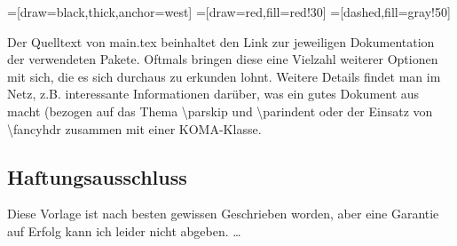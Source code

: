 =[draw=black,thick,anchor=west]
=[draw=red,fill=red!30]
=[dashed,fill=gray!50]

Der Quelltext von main.tex beinhaltet den Link zur jeweiligen Dokumentation der verwendeten Pakete. Oftmals bringen diese eine Vielzahl weiterer Optionen mit sich, die es sich durchaus zu erkunden lohnt.
Weitere Details findet man im Netz, z.B.  interessante Informationen darüber, was ein gutes Dokument aus macht (bezogen auf das Thema \textbackslash parskip und \textbackslash parindent oder der Einsatz von \textbackslash fancyhdr zusammen mit einer KOMA-Klasse.
\subsection{Haftungsausschluss}
\label{sec:haftausschl}
Diese Vorlage ist nach besten gewissen Geschrieben worden, aber eine Garantie auf Erfolg kann ich leider nicht abgeben.
\dots

